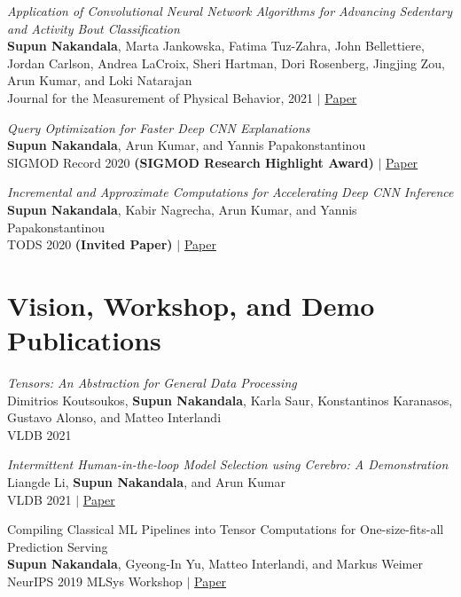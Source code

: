 \documentclass[margin]{res}
\begin{document}
\begin{resume}
\par
\textit{Application of Convolutional Neural Network Algorithms for Advancing Sedentary and Activity Bout Classification} \\
\textbf{Supun Nakandala}, Marta Jankowska, Fatima Tuz-Zahra, John Bellettiere, Jordan Carlson, Andrea LaCroix, Sheri Hartman, Dori Rosenberg, Jingjing Zou, Arun Kumar, and Loki Natarajan\\
Journal for the Measurement of Physical Behavior, 2021 $|$ \href{https://adalabucsd.github.io/papers/2021_JMPB_CNN.pdf}{Paper}

\par
\textit{Query Optimization for Faster Deep CNN Explanations} \\
\textbf{Supun Nakandala}, Arun Kumar, and Yannis Papakonstantinou\\
SIGMOD Record 2020 \textbf{(SIGMOD Research Highlight Award)} $|$ \href{https://adalabucsd.github.io/papers/2020_Krypton_SIGMODRecord.pdf}{Paper}

\par
\textit{Incremental and Approximate Computations for Accelerating Deep CNN Inference} \\
\textbf{Supun Nakandala}, Kabir Nagrecha, Arun Kumar, and Yannis Papakonstantinou\\
TODS 2020 \textbf{(Invited Paper)} $|$ \href{https://adalabucsd.github.io/papers/2020_Krypton_TODS.pdf}{Paper}


\section{Vision, Workshop, and Demo Publications}
\par
\textit{Tensors: An Abstraction for General Data Processing} \\
Dimitrios Koutsoukos, \textbf{Supun Nakandala}, Karla Saur, Konstantinos Karanasos, Gustavo Alonso, and Matteo Interlandi\\
VLDB 2021

\par
\textit{Intermittent Human-in-the-loop Model Selection using Cerebro: A Demonstration} \\
Liangde Li, \textbf{Supun Nakandala}, and Arun Kumar\\
VLDB 2021 $|$ \href{https://adalabucsd.github.io/papers/TR_2021_Intermittent_HIL_MS.pdf}{Paper}

\par
Compiling Classical ML Pipelines into Tensor Computations for One-size-fits-all Prediction Serving \\
\textbf{Supun Nakandala}, Gyeong-In Yu, Matteo Interlandi, and Markus Weimer\\
NeurIPS 2019 MLSys Workshop $|$ \href{http://learningsys.org/neurips19/assets/papers/27_CameraReadySubmission_Hummingbird%20(5).pdf}{Paper}


\end{resume}
\end{document}
